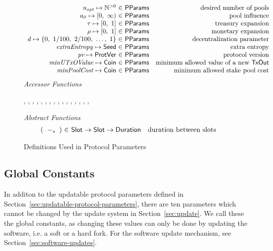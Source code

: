 \begin{figure*}[htb]
\begin{equation*}
\begin{array}{r@{~\in~}lr}
        \var{n_{opt}} \mapsto \Npos & \PParams & \text{desired number of pools}\\
        \var{a_0} \mapsto \nonnegReals & \PParams & \text{pool influence}\\
        \tau \mapsto \unitInterval & \PParams & \text{treasury expansion}\\
        \rho \mapsto \unitInterval & \PParams & \text{monetary expansion}\\
        \var{d} \mapsto \{0,~1/100,~2/100,~\ldots,~1\} & \PParams & \text{decentralization parameter}\\
        \var{extraEntropy} \mapsto \Seed & \PParams & \text{extra entropy}\\
        \var{pv} \mapsto \ProtVer & \PParams & \text{protocol version}\\
        \var{minUTxOValue} \mapsto \Coin & \PParams & \text{minimum allowed value of a new \TxOut}\\
        \var{minPoolCost} \mapsto \Coin & \PParams & \text{minimum allowed stake pool cost}\\
      \end{array}
  \end{equation*}
  \emph{Accessor Functions}
  \begin{center}
    ,
    ,
    ,
    ,
    ,
    ,
    ,
    ,
    ,
    ,
    ,
    ,
    ,
    ,
    ,
    ,
  \end{center}
  \emph{Abstract Functions}
  \begin{equation*}
    \begin{array}{r@{~\in~}lr}
      (\slotminus{}{}) & \Slot \to \Slot \to \Duration
                       & \text{duration between slots}
    \end{array}
  \end{equation*}
  \caption{Definitions Used in Protocol Parameters}
  \label{fig:defs:protocol-parameters}
\end{figure*}

\subsection{Global Constants}
\label{sec:global-constants}

In additon to the updatable protocol parameters defined in
Section~\ref{sec:updatable-protocol-parameters},
there are ten parameters which cannot be changed by the update
system in Section~\ref{sec:update}.
We call these the global constants, as changing these values can only
be done by updating the software, i.e. a soft or a hard fork.
For the software update mechanism, see Section~\ref{sec:software-updates}.

